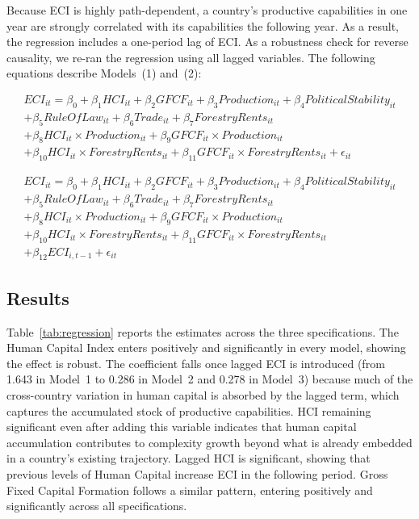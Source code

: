 \documentclass[12pt,a4paper]{report}
\begin{document}
Because ECI is highly path-dependent, a country's productive capabilities in one year are strongly correlated with its capabilities the following year. As a result, the regression includes a one-period lag of ECI. As a robustness check for reverse causality, we re-ran the regression using all lagged variables. The following equations describe Models~(1) and~(2):

\begin{equation}
\begin{split}
ECI_{it} = \beta_0 + \beta_1 HCI_{it} + \beta_2 GFCF_{it} + \beta_3 Production_{it} + \beta_4 PoliticalStability_{it} \\
+ \beta_5 RuleOfLaw_{it} + \beta_6 Trade_{it} + \beta_7 ForestryRents_{it} \\
+ \beta_8 HCI_{it} \times Production_{it} + \beta_9 GFCF_{it} \times Production_{it} \\
+ \beta_{10} HCI_{it} \times ForestryRents_{it} + \beta_{11} GFCF_{it} \times ForestryRents_{it} + \epsilon_{it}
\end{split}
\end{equation}

\begin{equation}
\begin{split}
ECI_{it} = \beta_0 + \beta_1 HCI_{it} + \beta_2 GFCF_{it} + \beta_3 Production_{it} + \beta_4 PoliticalStability_{it} \\
+ \beta_5 RuleOfLaw_{it} + \beta_6 Trade_{it} + \beta_7 ForestryRents_{it} \\
+ \beta_8 HCI_{it} \times Production_{it} + \beta_9 GFCF_{it} \times Production_{it} \\
+ \beta_{10} HCI_{it} \times ForestryRents_{it} + \beta_{11} GFCF_{it} \times ForestryRents_{it} \\
+ \beta_{12} ECI_{i,t-1} + \epsilon_{it}
\end{split}
\end{equation}

\subsection{Results}

Table~\ref{tab:regression} reports the estimates across the three specifications. The Human Capital Index enters positively and significantly in every model, showing the effect is robust. The coefficient falls once lagged ECI is introduced (from 1.643 in Model~1 to 0.286 in Model~2 and 0.278 in Model~3) because much of the cross-country variation in human capital is absorbed by the lagged term, which captures the accumulated stock of productive capabilities. HCI remaining significant even after adding this variable indicates that human capital accumulation contributes to complexity growth beyond what is already embedded in a country's existing trajectory. Lagged HCI is significant, showing that previous levels of Human Capital increase ECI in the following period. Gross Fixed Capital Formation follows a similar pattern, entering positively and significantly across all specifications.
\end{document}
